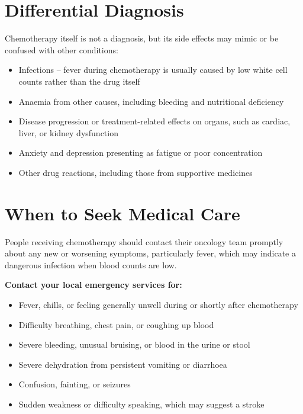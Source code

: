 \section*{Differential Diagnosis}
Chemotherapy itself is not a diagnosis, but its side effects may mimic or be confused with other conditions:
\begin{itemize}
    \item Infections -- fever during chemotherapy is usually caused by low white cell counts rather than the drug itself
    \item Anaemia from other causes, including bleeding and nutritional deficiency
    \item Disease progression or treatment-related effects on organs, such as cardiac, liver, or kidney dysfunction
    \item Anxiety and depression presenting as fatigue or poor concentration
    \item Other drug reactions, including those from supportive medicines
\end{itemize}

\section*{When to Seek Medical Care}
People receiving chemotherapy should contact their oncology team promptly about any new or worsening symptoms, particularly fever, which may indicate a dangerous infection when blood counts are low.

\medskip
\textbf{Contact your local emergency services for:}
\begin{itemize}
    \item Fever, chills, or feeling generally unwell during or shortly after chemotherapy
    \item Difficulty breathing, chest pain, or coughing up blood
    \item Severe bleeding, unusual bruising, or blood in the urine or stool
    \item Severe dehydration from persistent vomiting or diarrhoea
    \item Confusion, fainting, or seizures
    \item Sudden weakness or difficulty speaking, which may suggest a stroke
\end{itemize}

